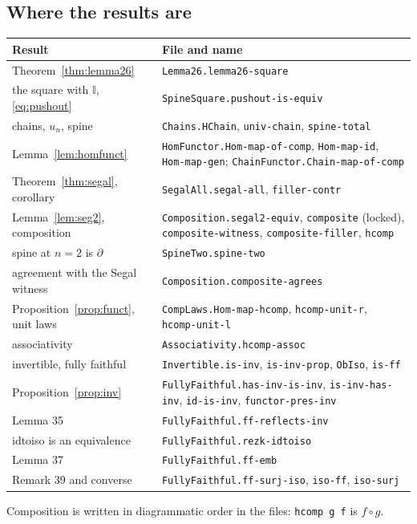 \documentclass[11pt]{amsart}
\numberwithin{equation}{section}
\theoremstyle{definition}
\theoremstyle{remark}
\newcommand{\code}[1]{\texttt{#1}}
\newcommand{\II}{\mathbb{I}}
\begin{document}
\subsection{Where the results are}
\begin{center}
\begin{tabular}{>{\raggedright}p{5.2cm}>{\raggedright\arraybackslash}p{8.6cm}}
\toprule
Result & File and name\\
\midrule
Theorem~\ref{thm:lemma26} & \code{Lemma26.lemma26-square}\\
the square with $\II$, \eqref{eq:pushout} & \code{SpineSquare.pushout-is-equiv}\\
chains, $u_n$, spine & \code{Chains.HChain}, \code{univ-chain}, \code{spine-total}\\
Lemma~\ref{lem:homfunct} & \code{HomFunctor.Hom-map-of-comp}, \code{Hom-map-id},
  \code{Hom-map-gen}; \code{ChainFunctor.Chain-map-of-comp}\\
Theorem~\ref{thm:segal}, corollary & \code{SegalAll.segal-all}, \code{filler-contr}\\
Lemma~\ref{lem:seg2}, composition & \code{Composition.segal2-equiv}, \code{composite} (locked),
  \code{composite-witness}, \code{composite-filler}, \code{hcomp}\\
spine at $n=2$ is $\partial$ & \code{SpineTwo.spine-two}\\
agreement with the Segal witness & \code{Composition.composite-agrees}\\
Proposition~\ref{prop:funct}, unit laws & \code{CompLaws.Hom-map-hcomp}, \code{hcomp-unit-r}, \code{hcomp-unit-l}\\
associativity & \code{Associativity.hcomp-assoc}\\
invertible, fully faithful & \code{Invertible.is-inv}, \code{is-inv-prop}, \code{ObIso}, \code{is-ff}\\
Proposition~\ref{prop:inv} & \code{FullyFaithful.has-inv-is-inv}, \code{is-inv-has-inv},
  \code{id-is-inv}, \code{functor-pres-inv}\\
Lemma 35 & \code{FullyFaithful.ff-reflects-inv}\\
idtoiso is an equivalence & \code{FullyFaithful.rezk-idtoiso}\\
Lemma 37 & \code{FullyFaithful.ff-emb}\\
Remark 39 and converse & \code{FullyFaithful.ff-surj-iso}, \code{iso-ff}, \code{iso-surj}\\
\bottomrule
\end{tabular}
\end{center}
Composition is written in diagrammatic order in the files:
\code{hcomp g f} is $f\circ g$.
\end{document}
